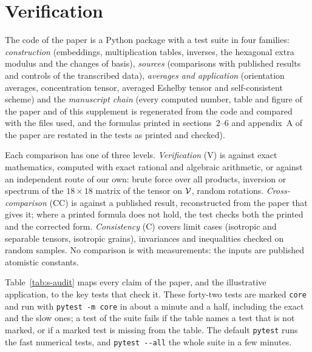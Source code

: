 \section{Verification}\label{sup:verification}

The code of the paper is a Python package with a test suite in four families:
\emph{construction} (embeddings, multiplication tables, inverses, the hexagonal extra
modulus and the changes of basis), \emph{sources} (comparisons with published results
and controls of the transcribed data), \emph{averages and application} (orientation
averages, concentration tensor, averaged Eshelby tensor and self-consistent scheme) and
the \emph{manuscript chain} (every computed number, table and figure of the paper and of
this supplement is regenerated from the code and compared with the files used, and the
formulas printed in sections~2--6 and appendix~A of the paper are restated in the tests as
printed and checked).

Each comparison has one of three levels. \emph{Verification} (V) is against exact
mathematics, computed with exact rational and algebraic arithmetic, or against an
independent route of our own: brute force over all products, inversion or spectrum of
the $18\times18$ matrix of the tensor on $\mathcal{V}$, random rotations. \emph{Cross-comparison}
(CC) is against a published result, reconstructed from the paper that gives it; where a
printed formula does not hold, the test checks both the printed and the corrected form.
\emph{Consistency} (C) covers limit cases (isotropic and separable tensors, isotropic
grains), invariances and inequalities checked on random samples. No comparison is with
measurements: the inputs are published atomistic constants.

Table~\ref{tab:s-audit} maps every claim of the paper, and the illustrative application,
to the key tests that check it. These forty-two tests are marked \texttt{core} and run with
\texttt{pytest -m core} in about a minute and a half, including the exact and the slow
ones; a test of the suite fails if the table names a test that is not marked, or if a
marked test is missing from the table. The default \texttt{pytest} runs the fast
numerical tests, and \texttt{pytest -{}-all} the whole suite in a few minutes.

\newcommand{\AuditMapCaption}{Audit map of the verification. Tests are named as
\texttt{file:function}, for the function \texttt{test\_function} of
\texttt{tests/test\_file.py} in the code repository. Levels: V, verification; CC,
cross-comparison with a published result; C, consistency.\label{tab:s-audit}}
\begingroup\footnotesize\setlength{\LTcapwidth}{\linewidth}

\endgroup
